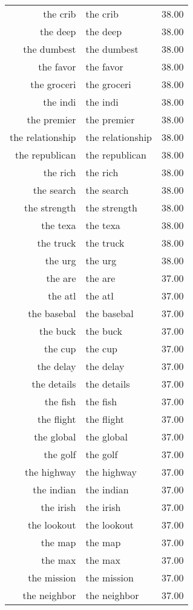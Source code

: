 \begin{table}[ht]
\begin{tabular}{rlr}
  the crib & the crib & 38.00 \\ 
  the deep & the deep & 38.00 \\ 
  the dumbest & the dumbest & 38.00 \\ 
  the favor & the favor & 38.00 \\ 
  the groceri & the groceri & 38.00 \\ 
  the indi & the indi & 38.00 \\ 
  the premier & the premier & 38.00 \\ 
  the relationship & the relationship & 38.00 \\ 
  the republican & the republican & 38.00 \\ 
  the rich & the rich & 38.00 \\ 
  the search & the search & 38.00 \\ 
  the strength & the strength & 38.00 \\ 
  the texa & the texa & 38.00 \\ 
  the truck & the truck & 38.00 \\ 
  the urg & the urg & 38.00 \\ 
  the are & the are & 37.00 \\ 
  the atl & the atl & 37.00 \\ 
  the basebal & the basebal & 37.00 \\ 
  the buck & the buck & 37.00 \\ 
  the cup & the cup & 37.00 \\ 
  the delay & the delay & 37.00 \\ 
  the details & the details & 37.00 \\ 
  the fish & the fish & 37.00 \\ 
  the flight & the flight & 37.00 \\ 
  the global & the global & 37.00 \\ 
  the golf & the golf & 37.00 \\ 
  the highway & the highway & 37.00 \\ 
  the indian & the indian & 37.00 \\ 
  the irish & the irish & 37.00 \\ 
  the lookout & the lookout & 37.00 \\ 
  the map & the map & 37.00 \\ 
  the max & the max & 37.00 \\ 
  the mission & the mission & 37.00 \\ 
  the neighbor & the neighbor & 37.00 \\ 

\end{tabular}
\end{table}
